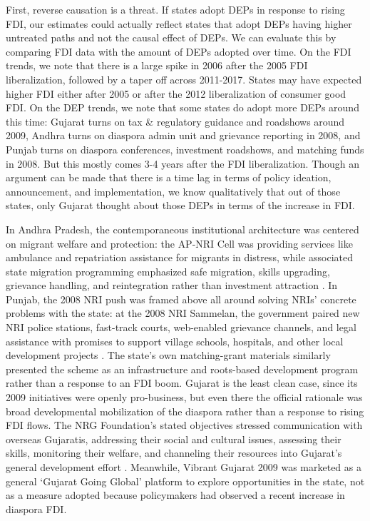 \documentclass[12pt]{article}
\begin{document}
First, reverse causation is a threat. If states adopt DEPs in response to rising FDI, our estimates could actually reflect states that adopt DEPs having higher untreated paths and not the causal effect of DEPs. 
We can evaluate this by comparing FDI data with the amount of DEPs adopted over time. On the FDI trends, we note that there is a large spike in 2006 after the 2005 FDI liberalization, followed by a taper off across 2011-2017. States may have expected higher FDI either after 2005 or after the 2012 liberalization of consumer good FDI.  On the DEP trends, we note that some states do adopt more DEPs around this time: Gujarat turns on tax \& regulatory guidance and roadshows around 2009, Andhra turns on diaspora admin unit and grievance reporting in 2008, and Punjab turns on diaspora conferences, investment roadshows, and matching funds in 2008. But this mostly comes 3-4 years after the FDI liberalization. Though an argument can be made that there is a time lag in terms of policy ideation, announcement, and implementation, we know qualitatively that out of those states, only Gujarat thought about those DEPs in terms of the increase in FDI. 

In Andhra Pradesh, the contemporaneous institutional architecture was centered on migrant welfare and protection: the AP-NRI Cell was providing services like ambulance and repatriation assistance for migrants in distress, while associated state migration programming emphasized safe migration, skills upgrading, grievance handling, and reintegration rather than investment attraction \citet{society_andhra_nodate}. In Punjab, the 2008 NRI push was framed above all around solving NRIs’ concrete problems with the state: at the 2008 NRI Sammelan, the government paired new NRI police stations, fast-track courts, web-enabled grievance channels, and legal assistance with promises to support village schools, hospitals, and other local development projects \citep{noauthor_nri_nodate, noauthor_nine_2013}. The state’s own matching-grant materials similarly presented the scheme as an infrastructure and roots-based development program rather than a response to an FDI boom. Gujarat is the least clean case, since its 2009 initiatives were openly pro-business, but even there the official rationale was broad developmental mobilization of the diaspora rather than a response to rising FDI flows. The NRG Foundation’s stated objectives stressed communication with overseas Gujaratis, addressing their social and cultural issues, assessing their skills, monitoring their welfare, and channeling their resources into Gujarat’s general development effort \citep{noauthor_home_nodate}. Meanwhile, Vibrant Gujarat 2009 was marketed as a general ‘Gujarat Going Global’ platform to explore opportunities in the state, not as a measure adopted because policymakers had observed a recent increase in diaspora FDI.
\end{document}
